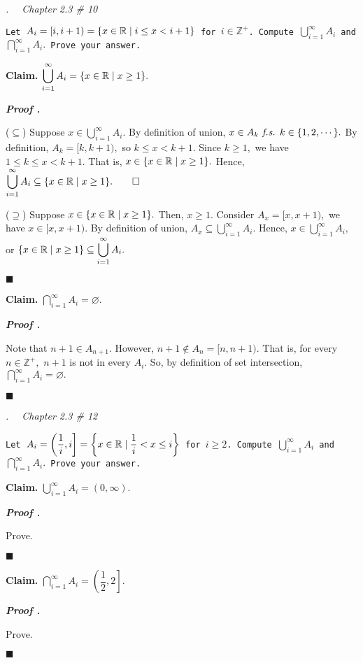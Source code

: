 \documentclass[11pt,letter]{article}
\newcounter{nq}[section]
\newcounter{np}[section]
\newenvironment*{p}{\par\noindent\textbf{\textit{Proof \stepcounter{np}\thenp. }}\par}{\par\hfill $\blacksquare$\par}
\newenvironment*{q}[1]{\noindent\emph{\thesection.\stepcounter{nq}\thenq$\quad $ #1}\par\noindent\texttt}{}
\newenvironment*{clm}{\par\noindent\textbf{Claim. }}{\par}
\def\Z{{\mathbb{Z}}}
\def\R{{\mathbb{R}}}
\def\Zp{{\Z^+}}
\def\emptyset{\varnothing}
\def\fs{\emph{ f.s. }}
\def\dsst{\displaystyle}
\begin{document}
\begin{framed}\begin{q}
	{Chapter 2.3 \# 10}
	{Let $A_i=[i,i+1)=\qty{x\in\R\mid i\leq x<i+1}$ for $i\in\Zp$. Compute $\dsst\bigcup_{i=1}^\infty A_i$ and $\dsst\bigcap_{i=1}^\infty A_i.$ Prove your answer.}
\end{q}\end{framed}
\begin{clm}
	$\dsst\bigcup_{i=1}^\infty A_i=\qty{x\in\R\mid x\geq1}.$
\end{clm}
\begin{p}
	($\subseteq$) Suppose $x\in\dsst\bigcup_{i=1}^\infty A_i.$ By definition of union, $x\in A_k\fs k\in\qty{1,2,\cdots}.$ By definition, $A_k=[k,k+1),$ so $k\leq x<k+1.$ Since $k\geq1,$ we have $1\leq k\leq x<k+1.$ That is, $x\in\qty{x\in\R\mid x\geq1}.$ Hence, $\dsst\bigcup_{i=1}^\infty A_i\subseteq\qty{x\in\R\mid x\geq1}.\qquad\square$\par 
	($\supseteq$) Suppose $x\in\qty{x\in\R\mid x\geq1}.$ Then, $x\geq1.$ Consider $A_x=[x,x+1),$ we have $x\in[x,x+1).$ By definition of union, $A_x\subseteq\dsst\bigcup_{i=1}^\infty A_i.$ Hence, $x\in\dsst\bigcup_{i=1}^\infty A_i,$ or $\qty{x\in\R\mid x\geq1}\subseteq\dsst\bigcup_{i=1}^\infty A_i.$
\end{p}
\begin{clm}
	$\dsst\bigcap_{i=1}^\infty A_i=\emptyset.$
\end{clm}
\begin{p}
	Note that $n+1\in A_{n+1}$.	However, $n+1\notin A_n=[n,n+1).$ That is, for every $n\in\Zp,$ $n+1$ is not in every $A_i.$ So, by definition of set intersection, $\dsst\bigcap_{i=1}^\infty A_i=\emptyset.$
\end{p}

\begin{framed}\begin{q}
	{Chapter 2.3 \# 12}
	{Let $A_i=\left(\dfrac{1}{i},i\right]=\qty{x\in\R\mid \dfrac{1}{i}<x\leq i}$ for $i\geq2$. Compute $\dsst\bigcup_{i=1}^\infty A_i$ and $\dsst\bigcap_{i=1}^\infty A_i.$ Prove your answer.}
\end{q}\end{framed}
\begin{clm}
	$\dsst\bigcup_{i=1}^\infty A_i=(0,\infty).$
\end{clm}
\begin{p}
	Prove.	
\end{p}
\begin{clm}
	$\dsst\bigcap_{i=1}^\infty A_i=\left(\dfrac{1}{2},2\right].$
\end{clm}
\begin{p}
	Prove.	
\end{p}
\end{document}
